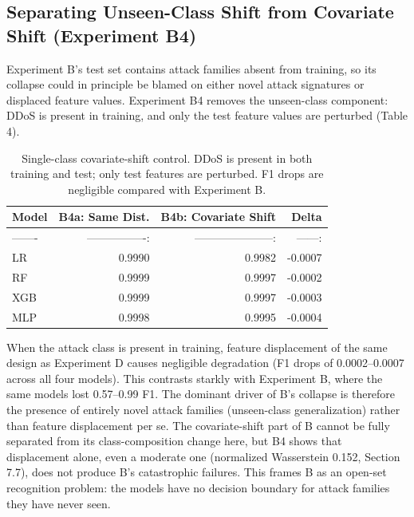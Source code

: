\documentclass[10pt]{article}
\begin{document}
\subsection{Separating Unseen-Class Shift from Covariate Shift (Experiment B4)}
Experiment B's test set contains attack families absent from training, so its collapse could in principle be blamed on either novel attack signatures or displaced feature values. Experiment B4 removes the unseen-class component: DDoS is present in training, and only the test feature values are perturbed (Table 4).
\begin{table}[ht]
\centering
\small
\setlength{\tabcolsep}{5pt}
\caption{Single-class covariate-shift control. DDoS is present in both training and test; only test features are perturbed. F1 drops are negligible compared with Experiment B.}
\begin{tabular}{l r r r}
\toprule
Model & B4a: Same Dist. & B4b: Covariate Shift & Delta \\
\midrule
------- & ----------------: & ---------------------: & ------: \\
LR & 0.9990 & 0.9982 & -0.0007 \\
RF & 0.9999 & 0.9997 & -0.0002 \\
XGB & 0.9999 & 0.9997 & -0.0003 \\
MLP & 0.9998 & 0.9995 & -0.0004 \\
\bottomrule
\end{tabular}
\end{table}
When the attack class is present in training, feature displacement of the same design as Experiment D causes negligible degradation (F1 drops of 0.0002--0.0007 across all four models). This contrasts starkly with Experiment B, where the same models lost 0.57--0.99 F1. The dominant driver of B's collapse is therefore the presence of entirely novel attack families (unseen-class generalization) rather than feature displacement per se. The covariate-shift part of B cannot be fully separated from its class-composition change here, but B4 shows that displacement alone, even a moderate one (normalized Wasserstein 0.152, Section 7.7), does not produce B's catastrophic failures. This frames B as an open-set recognition problem: the models have no decision boundary for attack families they have never seen.
\end{document}
